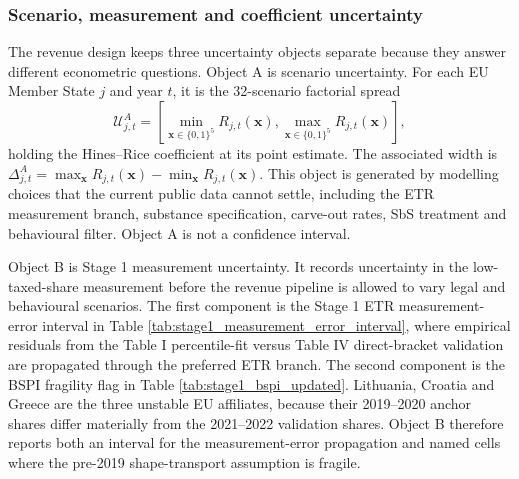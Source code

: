 \documentclass[11pt,a4paper]{article}
\begin{document}
\subsubsection{Scenario, measurement and coefficient uncertainty}\label{sec:two_uncertainties}

The revenue design keeps three uncertainty objects separate because they answer different econometric questions. Object A is scenario uncertainty. For each EU Member State $j$ and year $t$, it is the 32-scenario factorial spread
\begin{equation}\label{eq:object_a}
\mathcal{U}^{A}_{j,t}
=
\left[
\min_{\mathbf{x}\in\{0,1\}^5} R_{j,t}(\mathbf{x}),
\max_{\mathbf{x}\in\{0,1\}^5} R_{j,t}(\mathbf{x})
\right],
\end{equation}
holding the Hines--Rice coefficient at its point estimate. The associated width is $\Delta^{A}_{j,t}=\max_{\mathbf{x}}R_{j,t}(\mathbf{x})-\min_{\mathbf{x}}R_{j,t}(\mathbf{x})$. This object is generated by modelling choices that the current public data cannot settle, including the ETR measurement branch, substance specification, carve-out rates, SbS treatment and behavioural filter. Object A is not a confidence interval.

Object B is Stage 1 measurement uncertainty. It records uncertainty in the low-taxed-share measurement before the revenue pipeline is allowed to vary legal and behavioural scenarios. The first component is the Stage 1 ETR measurement-error interval in Table \ref{tab:stage1_measurement_error_interval}, where empirical residuals from the Table I percentile-fit versus Table IV direct-bracket validation are propagated through the preferred ETR branch. The second component is the BSPI fragility flag in Table \ref{tab:stage1_bspi_updated}. Lithuania, Croatia and Greece are the three unstable EU affiliates, because their 2019--2020 anchor shares differ materially from the 2021--2022 validation shares. Object B therefore reports both an interval for the measurement-error propagation and named cells where the pre-2019 shape-transport assumption is fragile.
\end{document}
